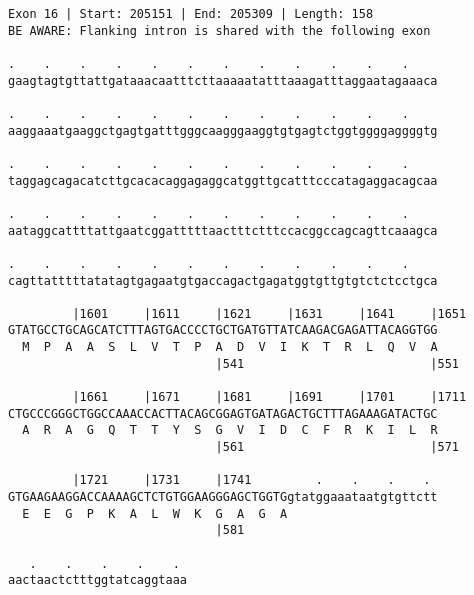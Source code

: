 \documentclass{article}
\begin{document}
\newpage
\begin{Verbatim}
Exon 16 | Start: 205151 | End: 205309 | Length: 158
BE AWARE: Flanking intron is shared with the following exon
 
.    .    .    .    .    .    .    .    .    .    .    .    
gaagtagtgttattgataaacaatttcttaaaaatatttaaagatttaggaatagaaaca
  
.    .    .    .    .    .    .    .    .    .    .    .    
aaggaaatgaaggctgagtgatttgggcaagggaaggtgtgagtctggtggggaggggtg
  
.    .    .    .    .    .    .    .    .    .    .    .    
taggagcagacatcttgcacacaggagaggcatggttgcatttcccatagaggacagcaa
  
.    .    .    .    .    .    .    .    .    .    .    .    
aataggcattttattgaatcggatttttaactttctttccacggccagcagttcaaagca
  
.    .    .    .    .    .    .    .    .    .    .    .    
cagttatttttatatagtgagaatgtgaccagactgagatggtgttgtgtctctcctgca
  
         |1601     |1611     |1621     |1631     |1641     |1651
GTATGCCTGCAGCATCTTTAGTGACCCCTGCTGATGTTATCAAGACGAGATTACAGGTGG
  M  P  A  A  S  L  V  T  P  A  D  V  I  K  T  R  L  Q  V  A
                             |541                          |551
  
         |1661     |1671     |1681     |1691     |1701     |1711
CTGCCCGGGCTGGCCAAACCACTTACAGCGGAGTGATAGACTGCTTTAGAAAGATACTGC
  A  R  A  G  Q  T  T  Y  S  G  V  I  D  C  F  R  K  I  L  R
                             |561                          |571
  
         |1721     |1731     |1741         .    .    .    . 
GTGAAGAAGGACCAAAAGCTCTGTGGAAGGGAGCTGGTGgtatggaaataatgtgttctt
  E  E  G  P  K  A  L  W  K  G  A  G  A                     
                             |581                           
  
   .    .    .    .    . 
aactaactctttggtatcaggtaaa
\end{Verbatim}
\newpage
\end{document}
